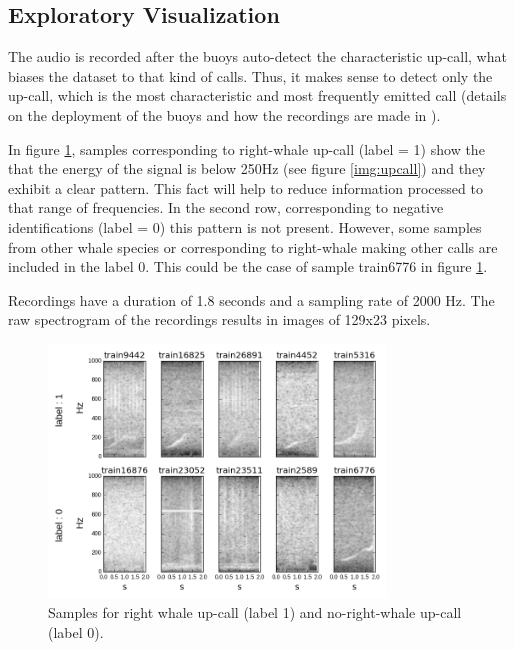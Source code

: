 \documentclass[]{article}
\begin{document}
\subsection{Exploratory Visualization}\label{exploratory-visualization}

The audio is recorded after the buoys auto-detect the characteristic up-call, what biases the dataset to that kind of calls. Thus, it makes sense to detect only the up-call, which is the most characteristic and most frequently emitted call (details on the deployment of the buoys and how the recordings are made in \cite{McDonald2002}). 

In figure \ref{img:samples}, samples corresponding to right-whale up-call (label = 1) show the that the energy of the signal is below 250Hz (see figure \ref{img:upcall}) and they exhibit a clear pattern. This fact will help to reduce information processed to that range of frequencies. 
In the second row, corresponding to negative identifications (label = 0) this pattern is not present. However, some samples from other whale species or corresponding to right-whale making other calls are included in the label 0. This could be the case of sample train6776 in figure \ref{img:samples}.

Recordings have a duration of 1.8 seconds and a sampling rate of 2000 Hz. The raw spectrogram of the recordings results in images of 129x23 pixels.

\begin{figure}[htpb!]
\centering
\includegraphics[width= 0.8\textwidth]{./images/2_samples}
\caption{Samples for right whale up-call (label 1) and no-right-whale up-call (label 0).  \label{img:samples}}
\end{figure} 
\end{document}
